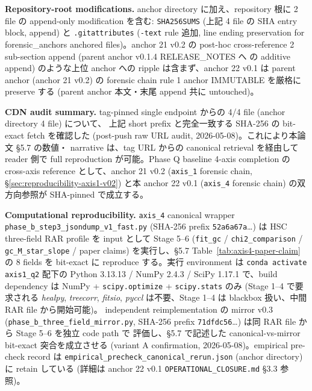 \documentclass[11pt,a4paper]{ltjsarticle}
\begin{document}
\noindent\textbf{Repository-root modifications.}\quad
anchor directory に加え、repository 根に 2 file の append-only modification を含む:
\texttt{SHA256SUMS} (上記 4 file の SHA entry block, append) と
\texttt{.gitattributes} (\texttt{-text} rule 追加, line ending preservation
for forensic\_anchors anchored files)。anchor 21 v0.2 の post-hoc
cross-reference 2 sub-section append (parent anchor v0.1.4 RELEASE\_NOTES へ
の additive append) のような上位 anchor への ripple は含まず、anchor 22 v0.1
は parent anchor (anchor 21 v0.2) の forensic chain rule 1 anchor IMMUTABLE
を厳格に preserve する (parent anchor 本文・末尾 append 共に untouched)。

\noindent\textbf{CDN audit summary.}\quad
tag-pinned single endpoint からの 4/4 file (anchor directory 4 file) について、
上記 short prefix と完全一致する SHA-256 の bit-exact fetch を確認した
(post-push raw URL audit, 2026-05-08)。これにより本論文 \S 5.7 の数値・
narrative は、tag URL からの canonical retrieval を経由して reader 側で
full reproduction が可能。Phase Q baseline 4-axis completion の cross-axis
reference として、anchor 21 v0.2 (\texttt{axis\_1} forensic chain, \S\ref{sec:reproducibility-axis1-v02})
と本 anchor 22 v0.1 (\texttt{axis\_4} forensic chain) の双方向参照が
SHA-pinned で成立する。

\noindent\textbf{Computational reproducibility.}\quad
\texttt{axis\_4} canonical wrapper
\texttt{phase\_b\_step3\_jsondump\_v1\_fast.py} (SHA-256 prefix
\texttt{52a6a67a}\dots) は HSC three-field RAR profile を input として
Stage 5--6 (\texttt{fit\_gc} / \texttt{chi2\_comparison} /
\texttt{gc\_M\_star\_slope} / paper claims) を実行し、\S 5.7
Table~\ref{tab:axis4-paper-claim} の 8 fields を bit-exact に reproduce
する。実行 environment は \texttt{conda activate axis1\_q2}
配下の Python 3.13.13 / NumPy 2.4.3 / SciPy 1.17.1 で、build dependency
は NumPy + \texttt{scipy.optimize} + \texttt{scipy.stats} のみ
(Stage 1--4 で要求される \emph{healpy}, \emph{treecorr}, \emph{fitsio},
\emph{pyccl} は不要、Stage 1--4 は blackbox 扱い、中間 RAR file から開始可能)。
independent reimplementation の mirror v0.3
(\texttt{phase\_b\_three\_field\_mirror.py}, SHA-256 prefix
\texttt{71dfdc56}\dots) は同 RAR file から Stage 5--6 を独立 code path で
評価し、\S 5.7 で記述した canonical-vs-mirror bit-exact 突合を成立させる
(variant A confirmation, 2026-05-08)。empirical pre-check record は
\texttt{empirical\_precheck\_canonical\_rerun.json}
(anchor directory) に retain している (詳細は anchor 22 v0.1
\texttt{OPERATIONAL\_CLOSURE.md} \S 3.3 参照)。
\end{document}
